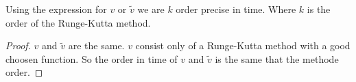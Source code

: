  \begin{cor}
  Using the expression for $v$ or $\tilde{v}$ we are $k$ order precise in time. Where $k$ is the order of the Runge-Kutta method.
 \end{cor}
 \begin{proof}
  $v$ and $\tilde{v}$ are the same.
  $v$ consist only of a Runge-Kutta method with a good choosen function.
  So the order in time of $v$ and $\tilde{v}$ is the same that the methode order.
 \end{proof}

